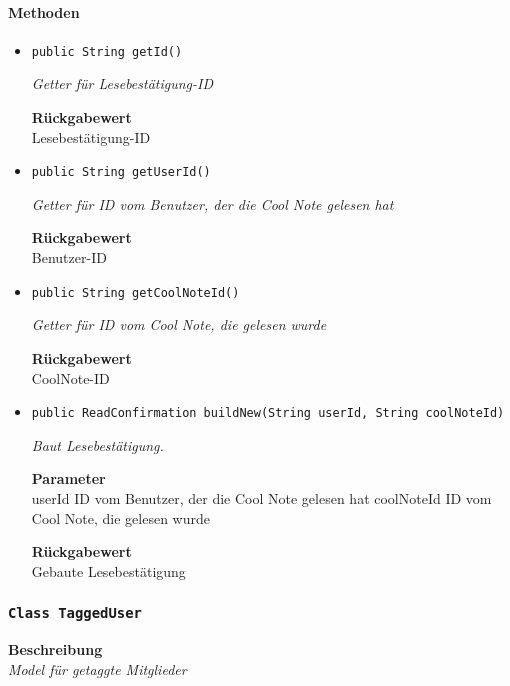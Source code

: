     \paragraph*{Methoden}
    \begin{itemize}
    	\item{\texttt{public String getId()}}
    	
    	\textit{Getter für Lesebestätigung-ID}
    	
    	
    	
    	\textbf{Rückgabewert} \\
    	Lesebestätigung-ID        \item{\texttt{public String getUserId()}}
    	
    	\textit{Getter für ID vom Benutzer, der die Cool Note gelesen hat}
    	
    	
    	
    	\textbf{Rückgabewert} \\
    	Benutzer-ID        \item{\texttt{public String getCoolNoteId()}}
    	
    	\textit{Getter für ID vom Cool Note, die gelesen wurde}
    	
    	
    	
    	\textbf{Rückgabewert} \\
    	CoolNote-ID        \item{\texttt{public ReadConfirmation buildNew(String userId, String coolNoteId)}}
    	
    	\textit{Baut Lesebestätigung.}
    	
    	\textbf{Parameter} \\
    	userId ID vom Benutzer, der die Cool Note gelesen hat
    	coolNoteId ID vom Cool Note, die gelesen wurde
    	
    	\textbf{Rückgabewert} \\
    	Gebaute Lesebestätigung
    \end{itemize}
    \subsubsection{\texttt{Class TaggedUser}}
    \textbf{Beschreibung} \\
    \textit{Model für getaggte Mitglieder}
